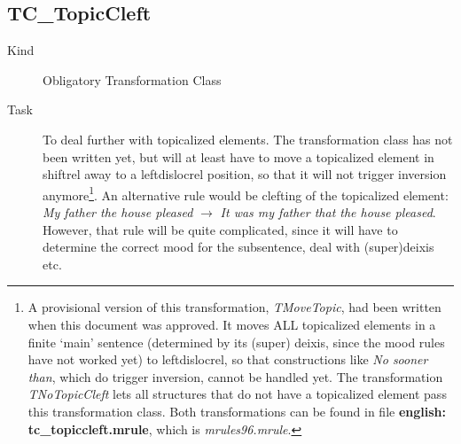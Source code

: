 \subsection{TC\_TopicCleft}
\begin{description}
\item[Kind] Obligatory Transformation Class
\item[Task] To deal further with topicalized elements. The transformation class 
has not been written yet, but will at least have to move a topicalized element 
in shiftrel away to a leftdislocrel position, so that it will not trigger 
inversion anymore\footnote{A provisional version of this transformation, {\em 
TMoveTopic\/}, had been written when this document was approved. It moves ALL 
topicalized elements in a finite `main' sentence (determined by its (super)
deixis, since the mood rules have not worked yet) to leftdislocrel, so that 
constructions like {\em No 
sooner than\/}, which do trigger inversion, cannot be handled yet. The 
transformation {\em TNoTopicCleft\/} lets all structures that do not have a 
topicalized element pass this transformation class. Both transformations can be 
found in file {\bf english: tc\_topiccleft.mrule}, which is {\em 
mrules96.mrule\/}.}. An 
alternative rule would be clefting of the topicalized element: {\em My father 
the house pleased\/} $\rightarrow$ {\em It was my father that the house 
pleased\/}. However, that rule will be quite complicated, since it will have to 
determine the correct mood for the subsentence, deal with (super)deixis etc.

\end{description}

\newpage
